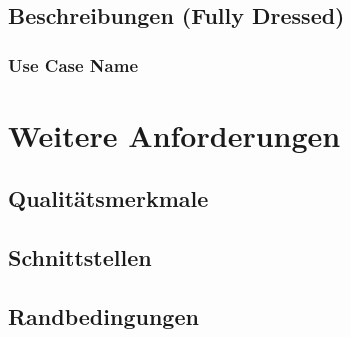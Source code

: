 \documentclass[a4paper]{article}
\let\oldsection\section
\renewcommand\section{\clearpage\oldsection}
\begin{document}
\subsection{Beschreibungen (Fully Dressed)}

\subsubsection{Use Case Name}

\pagebreak
\section{Weitere Anforderungen}

\subsection{Qualitätsmerkmale}

\subsection{Schnittstellen}

\subsection{Randbedingungen}
\end{document}
